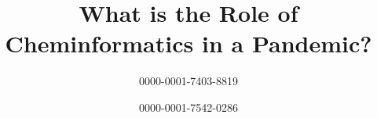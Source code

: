 \documentclass{bmcart}
\begin{document}
\begin{frontmatter}



\title{What is the Role of Cheminformatics in a Pandemic?}


\author[
   addressref={aff1},                   %
   email={rajarshi_guha@vrtx.com}   %
]{  0000-0001-7403-8819}
\author[
   addressref={aff2},                   %
   email={egon.willighagen@maastrichtuniversity.nl}   %
]{  0000-0001-7542-0286}



\address[id=aff1]{%
  , %
  ,                     %
  ,                              %
}


\end{frontmatter}
\end{document}
